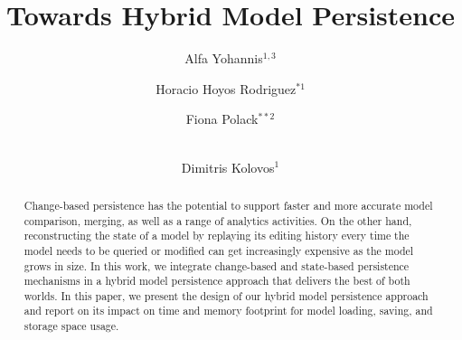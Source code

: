 \documentclass{llncs}
\begin{document}
\renewcommand{\thelstlisting}{\arabic{lstlisting}}
\renewcommand{\labelitemi}{$\bullet$}
\newcommand{\dk}[1]{\textbf{[DK: #1]}}

\title{Towards Hybrid Model Persistence}
%
%
\author{
Alfa Yohannis$^{1,3}$ \and Horacio Hoyos Rodriguez$^{*1}$ \and Fiona Polack$^{**2}$ \and \\ Dimitris Kolovos$^{1}$
}
%
%



\maketitle      %
\begin{abstract}
Change-based persistence has the potential to support faster and more accurate model comparison, merging, as well as a range of analytics activities. On the other hand, reconstructing the state of a model by replaying its editing history every time the model needs to be queried or modified can get increasingly expensive as the model grows in size. In this work, we integrate change-based and state-based persistence mechanisms in a hybrid model persistence approach that delivers the best of both worlds. In this paper, we present the design of our hybrid model persistence approach and report on its impact on time and memory footprint for model loading, saving, and storage space usage.
\end{abstract}
\end{document}
